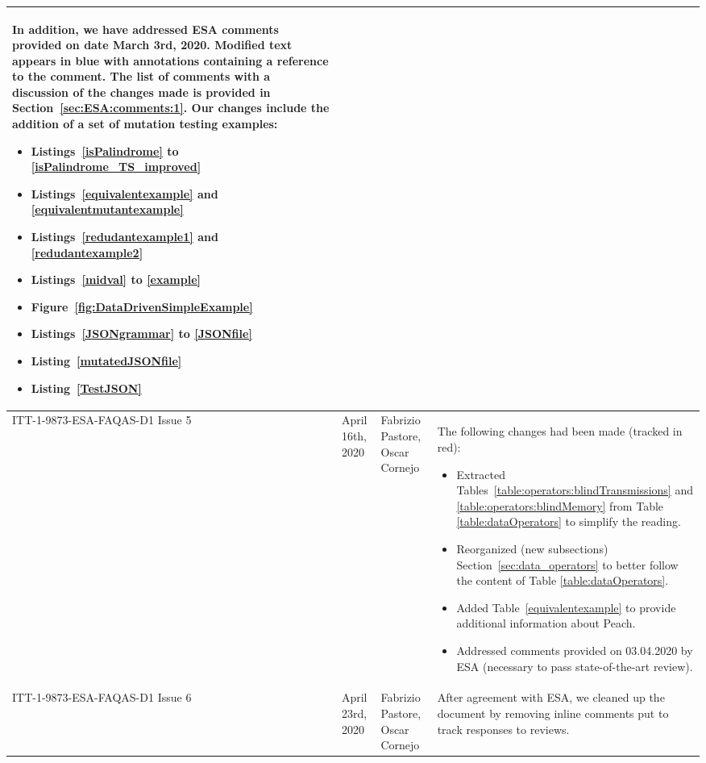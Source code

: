 \begin{longtable}{|p{2cm}|p{1cm}|p{1.5cm}|p{9cm}|@{}}
\begin{minipage}{8cm}
In addition, we have addressed ESA comments provided on date March 3rd, 2020. Modified text appears in blue with annotations containing a reference to the comment. The list of comments with a discussion of the changes made is provided in Section~\ref{sec:ESA:comments:1}. Our changes include the addition of a set of mutation testing examples:
\begin{itemize}
	\item Listings~\ref{isPalindrome} to \ref{isPalindrome_TS_improved}
	\item Listings~\ref{equivalentexample} and \ref{equivalentmutantexample}
	\item Listings~\ref{redudantexample1} and \ref{redudantexample2}	
	\item Listings~\ref{midval} to \ref{example}
	\item Figure~\ref{fig:DataDrivenSimpleExample}
	\item Listings~\ref{JSONgrammar} to \ref{JSONfile}
	\item Listing~\ref{mutatedJSONfile}
	\item Listing~\ref{TestJSON}
\end{itemize}

\end{minipage}

\\
\hline
ITT-1-9873-ESA-FAQAS-D1
Issue 5
&April 16th, 2020
&Fabrizio Pastore, Oscar Cornejo
&
\begin{minipage}{8cm}

The following changes had been made (tracked in red):
\begin{itemize}
	\item Extracted Tables~\ref{table:operators:blindTransmissions} and \ref{table:operators:blindMemory} from Table \ref{table:dataOperators} to simplify the reading.
	\item Reorganized (new subsections) Section~\ref{sec:data_operators} to better follow the content of Table \ref{table:dataOperators}.
	\item Added Table~\ref{equivalentexample} to provide additional information about Peach.
	\item Addressed comments provided on 03.04.2020 by ESA (necessary to pass state-of-the-art review).
\end{itemize}

\end{minipage}

\\
\hline
ITT-1-9873-ESA-FAQAS-D1
Issue 6
&April 23rd, 2020
&Fabrizio Pastore, Oscar Cornejo
&
After agreement with ESA, we cleaned up the document by removing inline comments put to track responses to reviews.


\end{longtable}
